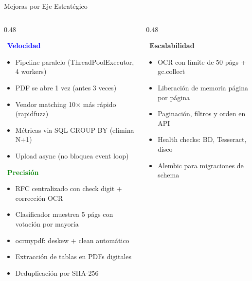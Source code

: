 \documentclass[aspectratio=169,10pt]{beamer}
\begin{document}
\begin{frame}{Mejoras por Eje Estrat\'egico}

\begin{columns}[T]
\begin{column}{0.48\textwidth}

\textcolor{blue}{\ \textbf{Velocidad}}
\begin{itemize}\small
\item Pipeline paralelo (ThreadPoolExecutor, 4 workers)
\item PDF se abre 1 vez (antes 3 veces)
\item Vendor matching 10$\times$ m\'as r\'apido (rapidfuzz)
\item M\'etricas via SQL GROUP BY (elimina N+1)
\item Upload async (no bloquea event loop)
\end{itemize}

\vspace{8pt}
\textcolor{green}{\ \textbf{Precisi\'on}}
\begin{itemize}\small
\item RFC centralizado con check digit + correcci\'on OCR
\item Clasificador muestrea 5 p\'ags con votaci\'on por mayor\'ia
\item ocrmypdf: deskew + clean autom\'atico
\item Extracci\'on de tablas en PDFs digitales
\item Deduplicaci\'on por SHA-256
\end{itemize}

\end{column}
\begin{column}{0.48\textwidth}

\textcolor{amber}{\ \textbf{Escalabilidad}}
\begin{itemize}\small
\item OCR con l\'imite de 50 p\'ags + gc.collect
\item Liberaci\'on de memoria p\'agina por p\'agina
\item Paginaci\'on, filtros y orden en API
\item Health checks: BD, Tesseract, disco
\item Alembic para migraciones de schema
\end{itemize}


\end{column}
\end{columns}
\end{frame}
\end{document}
